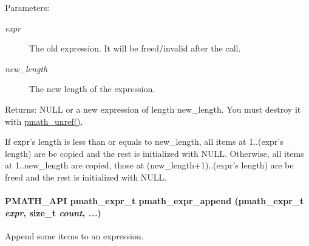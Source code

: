 \begin{Desc}
\item[Parameters:]
\begin{description}
\item[{\em expr}]The old expression. It will be freed/invalid after the call. \item[{\em new\_\-length}]The new length of the expression. \end{description}
\end{Desc}
\begin{Desc}
\item[Returns:]NULL or a new expression of length new\_\-length. You must destroy it with \hyperlink{classpmath__t_54e905402c38940687033b87eb8c6c9f}{pmath\_\-unref()}.\end{Desc}
If expr's length is less than or equals to new\_\-length, all items at 1..(expr's length) are be copied and the rest is initialized with NULL. Otherwise, all items at 1..new\_\-length are copied, those at (new\_\-length+1)..(expr's length) are be freed and the rest is initialized with NULL. \hypertarget{group__expressions_g8057092ab059876cd19e09c2ff7296d9}{
\paragraph[{pmath\_\-expr\_\-append}]{\setlength{\rightskip}{0pt plus 5cm}PMATH\_\-API {\bf pmath\_\-expr\_\-t} pmath\_\-expr\_\-append ({\bf pmath\_\-expr\_\-t} {\em expr}, \/  size\_\-t {\em count}, \/   {\em ...})}\hfill}
\label{group__expressions_g8057092ab059876cd19e09c2ff7296d9}


Append some items to an expression. 


